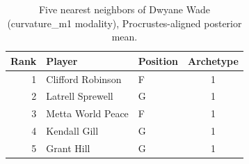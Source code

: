 \begin{table}[htbp]
  \centering\small
  \begin{tabular}{rllc}
    \toprule
    Rank & Player & Position & Archetype \\
    \midrule
    1 & Clifford Robinson & F & 1 \\
    2 & Latrell Sprewell & G & 1 \\
    3 & Metta World Peace & F & 1 \\
    4 & Kendall Gill & G & 1 \\
    5 & Grant Hill & G & 1 \\
    \bottomrule
  \end{tabular}
  \caption{Five nearest neighbors of Dwyane Wade (curvature_m1 modality), Procrustes-aligned posterior mean.}
  \label{tab:Dwyane_Wade_neighbors_curvature_m1}
\end{table}

